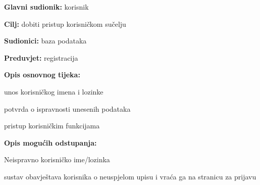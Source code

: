                     \noindent {}
					\begin{packed_item}
	
						\item \textbf{Glavni sudionik: }korisnik
						\item  \textbf{Cilj: }dobiti pristup korisničkom sučelju
						\item  \textbf{Sudionici: }baza podataka
						\item  \textbf{Preduvjet: }registracija
						\item  \textbf{Opis osnovnog tijeka:}
						
						\item[] \begin{packed_enum}
	
							\item unos korisničkog imena i lozinke
							\item potvrda o ispravnosti unesenih podataka
							\item pristup korisničkim funkcijama

						\end{packed_enum}
						
						\item  \textbf{Opis mogućih odstupanja:}
						
						\item[] \begin{packed_item}
	
							\item[2.a] Neispravno korisničko ime/lozinka 
							\item[] \begin{packed_enum}
								
								\item sustav obavještava korisnika o neuspjelom upisu i vraća ga na stranicu za prijavu
								
							\end{packed_enum}
							
						\end{packed_item}
					\end{packed_item}

